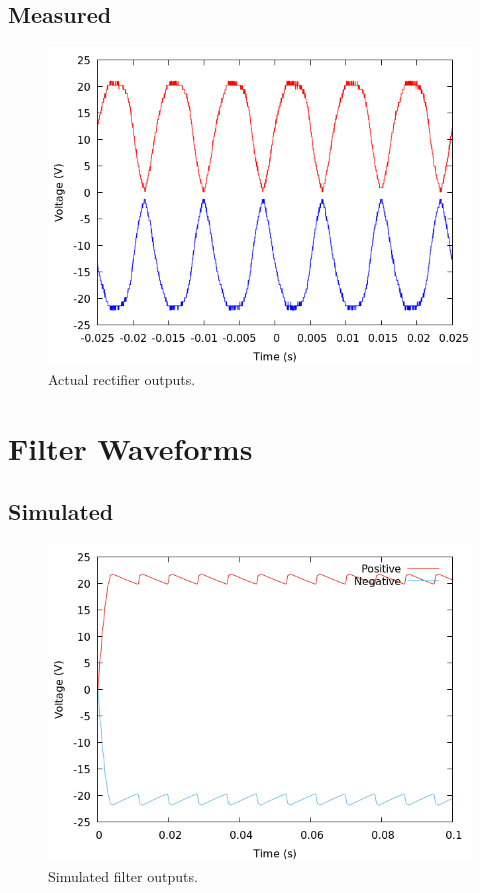 \documentclass[12pt]{article}
\newcommand{\graphwidth}{0.5\linewidth}
\begin{document}
\begin{appendix}
\subsection{Measured}

\begin{figure}[H]
    \centering
    \includegraphics[width=\graphwidth]{./res/image/rectifier-output.png}
    \caption{Actual rectifier outputs.}
    \label{fig:rectifier_unfiltered}
\end{figure}

\section{Filter Waveforms}

\subsection{Simulated}

\begin{figure}[H]
    \centering
    \includegraphics[width=\graphwidth]{./res/image/sim-filtered.png}
    \caption{Simulated filter outputs.}
    \label{sim:filtered}
\end{figure}


\end{appendix}
\end{document}
